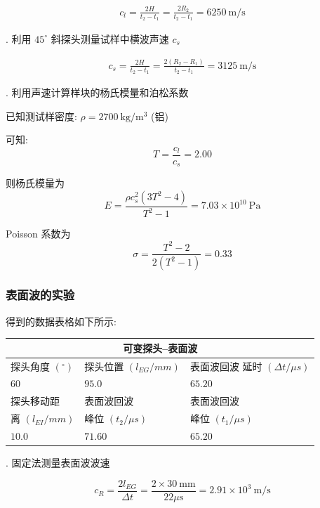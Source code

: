 \documentclass[UTF8]{ctexart}
\begin{document}
$$
\begin{gathered}
c_{l}=\frac{2 H}{t_{2}-t_{1}}=\frac{2 R_{2}}{t_{2}-t_{1}}=6250 \mathrm{~m} / \mathrm{s}
\end{gathered}
$$

. 利用 $45^{\circ}$ 斜探头测量试样中横波声速 $c_{s}$

$$
\begin{gathered}
c_{s}=\frac{2 H}{t_{2}-t_{1}}=\frac{2\left(R_{2}-R_{1}\right)}{t_{2}-t_{1}}=3125 \mathrm{~m} / \mathrm{s}
\end{gathered}
$$

. 利用声速计算样块的杨氏模量和泊松系数

已知测试样密度: $\rho=2700 \mathrm{~kg} / \mathrm{m}^{3}$ (铝)

可知:
$$
T=\frac{c_{l}}{c_{s}}=2.00
$$

则杨氏模量为
$$
E=\frac{\rho c_{s}^{2}\left(3 T^{2}-4\right)}{T^{2}-1}=7.03 \times 10^{10} \mathrm{~Pa}
$$

Poisson 系数为
$$
\sigma=\frac{T^{2}-2}{2\left(T^{2}-1\right)}=0.33
$$

\subsubsection{表面波的实验} 

\noindent 得到的数据表格如下所示:

\begin{center}
\begin{tabular}{|l|l|l|}
  \hline \multicolumn{3}{|c|}{ 可变探头–表面波 } \\
  \hline 探头角度 $\left({ }^{\circ}\right)$ & 探头位置 $\left(l_{E G} / m m\right)$ & 表面波回波 延时 $(\Delta t / \mu s)$ \\
  \hline 60 & $95.0$ & $65.20$ \\
  \hline 探头移动距 & 表面波回波 & 表面波回波 \\
  离 $\left(l_{E I} / m m\right)$ & 峰位 $\left(t_{2} / \mu s\right)$ & 峰位 $\left(t_{1} / \mu s\right)$ \\
  \hline $10.0$ & $71.60$ & $65.20$ \\
  \hline
\end{tabular}
\end{center}


. 固定法测量表面波波速

$$
c_{R}=\frac{2 l_{E G}}{\Delta t}=\frac{2 \times 30 \mathrm{~mm}}{22 \mu \mathrm{s}}=2.91 \times 10^{3} \mathrm{~m} / \mathrm{s}
$$
\end{document}
